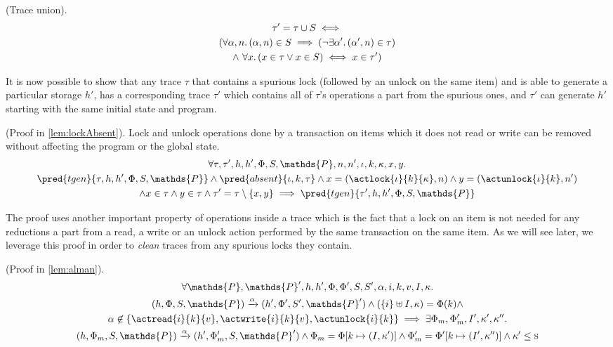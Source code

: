 \begin{defn}
	(Trace union).
	\begin{gather*}
		\tau' = \tau \cup S \iff \\
		(\forall \alpha, n \ldotp
		(\alpha, n) \in S \implies \left( \lnot \exists \alpha' \ldotp (\alpha', n) \in \tau \right) \\
		\land\ \forall x \ldotp (x \in \tau \lor x \in S) \iff x \in \tau')
	\end{gather*}
\end{defn}

It is now possible to show that any trace $\tau$ that contains a spurious lock (followed by an unlock on the same item) and is able to generate a particular storage $h'$, has a corresponding trace $\tau'$ which contains all of $\tau$'s operations a part from the spurious ones, and $\tau'$ can generate $h'$ starting with the same initial state and program.

\begin{lem}
	(Proof in \ref{lem:lockAbsent}).
	Lock and unlock operations done by a transaction on items which it does not read or write can be removed without affecting the program or the global state.
	\begin{gather*}
		\forall \tau, \tau', h, h', \Phi, S, \mathds{P}, n, n', \iota, k, \kappa, x, y \ldotp
			\\
		\pred{tgen}{\tau, h, h', \Phi, S, \mathds{P}} \land  \pred{absent}{\iota, k, \tau} \land x = (\actlock{\iota}{k}{\kappa}, n) \land y = (\actunlock{\iota}{k}, n') \\ \land x \in \tau \land y \in \tau
		\land \tau' = \tau \setminus \{ x, y \}
			\implies
		\pred{tgen}{\tau', h, h', \Phi, S, \mathds{P}}
	\end{gather*}
\end{lem}

The proof uses another important property of operations inside a trace which is the fact that a lock on an item is not needed for any reductions a part from a read, a write or an unlock action performed by the same transaction on the same item. As we will see later, we leverage this proof in order to \textit{clean} traces from any spurious locks they contain.

\begin{lem}
	(Proof in \ref{lem:alman}).
	\begin{gather*}
		\forall \mathds{P}, \mathds{P}', h, h', \Phi, \Phi', S, S', \alpha, i, k, v, I, \kappa \ldotp \\
		(h, \Phi, S, \mathds{P}) \xrightarrow{\alpha} (h', \Phi', S', \mathds{P}')
			\land
		(\{i\} \uplus I, \kappa) = \Phi(k)
			\land \\
		\alpha \not\in \{ \actread{i}{k}{v}, \actwrite{i}{k}{v}, \actunlock{i}{k} \}
			\implies
		\exists \Phi_m, \Phi_m', I', \kappa', \kappa'' \ldotp \\
		(h, \Phi_m, S, \mathds{P}) \xrightarrow{\alpha} (h', \Phi_m', S, \mathds{P}')
			\land
		\Phi_m = \Phi[k \mapsto (I, \kappa')]
			\land
		\Phi_m' = \Phi'[k \mapsto (I', \kappa'')]
			\land
		\kappa' \leq \textsc{s}
	\end{gather*}
\end{lem}

